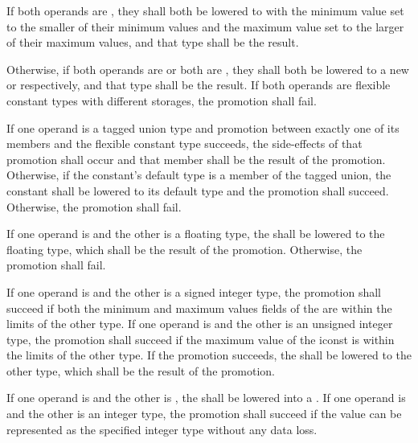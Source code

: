 \specsubitem
If both operands are , they shall both be lowered to
 with the minimum value set to the smaller of their
minimum values and the maximum value set to the larger of their maximum values,
and that type shall be the result.

\specsubitem
Otherwise, if both operands are  or both are ,
they shall both be lowered to a new  or 
respectively, and that type shall be the result. If both operands are flexible
constant types with different storages, the promotion shall fail.

\specsubitem
If one operand is a tagged union type and promotion between exactly one of its
members and the flexible constant type succeeds, the side-effects of that
promotion shall occur and that member shall be the result of the promotion.
Otherwise, if the constant's default type is a member of the tagged union, the
constant shall be lowered to its default type and the promotion shall succeed.
Otherwise, the promotion shall fail.

\specsubitem
If one operand is  and the other is a floating type, the
 shall be lowered to the floating type, which shall be the
result of the promotion. Otherwise, the promotion shall fail.


\specsubitem
If one operand is  and the other is a signed integer type, the
promotion shall succeed if both the minimum and maximum values fields of the
 are within the limits of the other type. If one operand is
 and the other is an unsigned integer type, the promotion shall
succeed if the maximum value of the iconst is within the limits of the other
type. If the promotion succeeds, the  shall be lowered to the
other type, which shall be the result of the promotion.

\specsubitem
If one operand is  and the other is , the
 shall be lowered into a . If one operand is
 and the other is an integer type, the promotion shall succeed
if the  value can be represented as the specified integer type
without any data loss.

